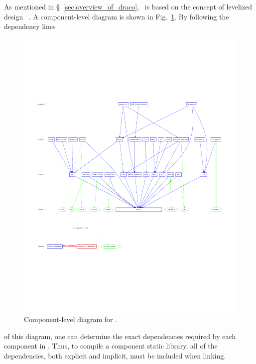 As mentioned in \S~\ref{sec:overview_of_draco}, \draco\ is based on
the concept of levelized design~\cite{la96} .  A component-level diagram
is shown in Fig.~\ref{fig:level}.  By following the dependency lines
\begin{figure}
  \centerline{\includegraphics[angle=90]{fig/level}}
  \caption{Component-level diagram for \draco.}
  \label{fig:level}
\end{figure}
of this diagram, one can determine the exact dependencies required by
each component in \draco.  Thus, to compile a component static library, all of
the dependencies, both explicit and implicit, must be included when linking.

